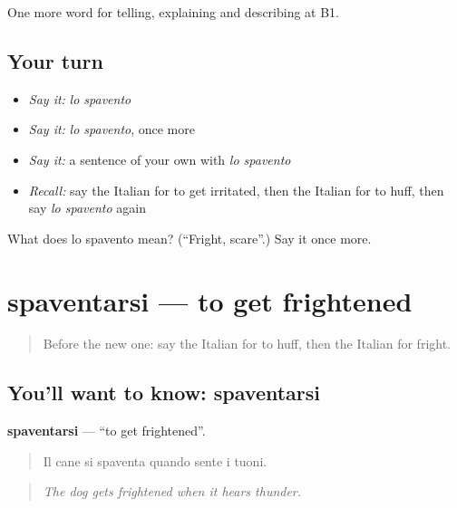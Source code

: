 \begin{grammarlens}[title={What you've built}]
One more word for telling, explaining and describing at B1.
\end{grammarlens}

\subsection*{Your turn}
\begin{itemize}
\raggedright
  \item \emph{Say it:} \emph{lo spavento}
  \item \emph{Say it:} \emph{lo spavento}, once more
  \item \emph{Say it:} a sentence of your own with \emph{lo spavento}
  \item \emph{Recall:} say the Italian for to get irritated, then the Italian for to huff, then say \emph{lo spavento} again
\end{itemize}

\begin{tcolorbox}[breakable,colback=teal!4,colframe=teal!35!black,title={Before you move on}]
What does lo spavento mean? (\textquotedblleft{}Fright, scare\textquotedblright{}.) Say it once more.
\end{tcolorbox}
\section[spaventarsi]{spaventarsi — to get frightened}

\label{lesson:IT-C475-spaventarsi}



\begin{quote}
Before the new one: say the Italian for to huff, then the Italian for fright.
\end{quote}

\subsection*{You'll want to know: spaventarsi}
\textbf{spaventarsi} — \textquotedblleft{}to get frightened\textquotedblright{}.

\begin{quote}
Il cane si spaventa quando sente i tuoni.
\end{quote}

\begin{quote}
\emph{The dog gets frightened when it hears thunder.}
\end{quote}

